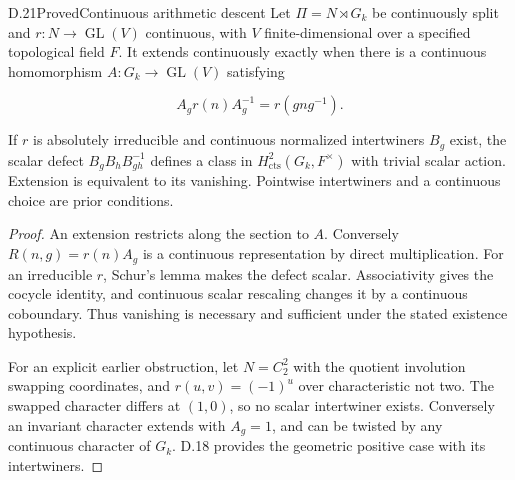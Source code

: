 \begin{statement}{D.21}{Proved}{Continuous arithmetic descent}
Let $\Pi=N\rtimes G_k$ be continuously split and
$r:N\to\operatorname{GL}(V)$ continuous, with $V$
finite-dimensional over a specified topological field $F$.
It extends continuously exactly when there is a continuous
homomorphism $A:G_k\to\operatorname{GL}(V)$ satisfying

$$
A_gr(n)A_g^{-1}=r(gng^{-1}).
$$

If $r$ is absolutely irreducible and continuous normalized
intertwiners $B_g$ exist, the scalar defect
$B_gB_hB_{gh}^{-1}$ defines a class in
$H^2_{\mathrm{cts}}(G_k,F^\times)$ with trivial scalar
action. Extension is equivalent to its vanishing.
Pointwise intertwiners and a continuous choice are prior
conditions.
\end{statement}
\begin{proof}
An extension restricts along the section to $A$.
Conversely $R(n,g)=r(n)A_g$ is a continuous representation
by direct multiplication.
For an irreducible $r$, Schur's lemma makes the defect
scalar. Associativity gives the cocycle identity,
and continuous scalar rescaling changes it by a
continuous coboundary. Thus vanishing is necessary
and sufficient under the stated existence hypothesis.

For an explicit earlier obstruction, let $N=C_2^2$
with the quotient involution swapping coordinates, and
$r(u,v)=(-1)^u$ over characteristic not two.
The swapped character differs at $(1,0)$, so no scalar
intertwiner exists. Conversely an invariant character
extends with $A_g=1$, and can be twisted by any continuous
character of $G_k$. D.18 provides the geometric positive
case with its intertwiners.
\end{proof}
